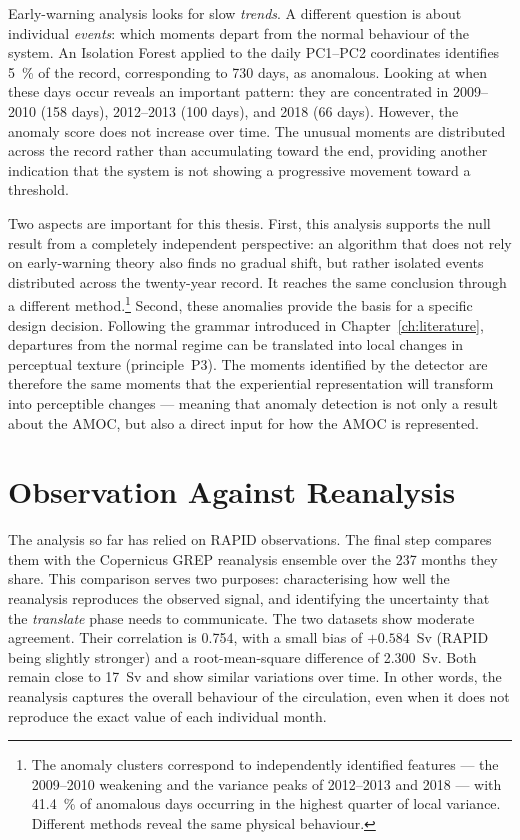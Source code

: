 Early-warning analysis looks for slow \emph{trends}. A different question is about individual \emph{events}: which moments depart from the normal behaviour of the system. An Isolation Forest applied to the daily PC1--PC2 coordinates identifies \SI{5}{\percent} of the record, corresponding to 730 days, as anomalous. Looking at when these days occur reveals an important pattern: they are concentrated in 2009--2010 (158 days), 2012--2013 (100 days), and 2018 (66 days). However, the anomaly score does not increase over time. The unusual moments are distributed across the record rather than accumulating toward the end, providing another indication that the system is not showing a progressive movement toward a threshold.



Two aspects are important for this thesis. First, this analysis supports the null result from a completely independent perspective: an algorithm that does not rely on early-warning theory also finds no gradual shift, but rather isolated events distributed across the twenty-year record. It reaches the same conclusion through a different method.\footnote{The anomaly clusters correspond to independently identified features --- the 2009--2010 weakening and the variance peaks of 2012--2013 and 2018 --- with \SI{41.4}{\percent} of anomalous days occurring in the highest quarter of local variance. Different methods reveal the same physical behaviour.} Second, these anomalies provide the basis for a specific design decision. Following the grammar introduced in Chapter~\ref{ch:literature}, departures from the normal regime can be translated into local changes in perceptual texture (principle~P3). The moments identified by the detector are therefore the same moments that the experiential representation will transform into perceptible changes --- meaning that anomaly detection is not only a result about the AMOC, but also a direct input for how the AMOC is represented.

\section{Observation Against Reanalysis}
\label{sec:detect-copernicus}

The analysis so far has relied on RAPID observations. The final step compares them with the Copernicus GREP reanalysis ensemble over the 237 months they share. This comparison serves two purposes: characterising how well the reanalysis reproduces the observed signal, and identifying the uncertainty that the \emph{translate} phase needs to communicate. The two datasets show moderate agreement. Their correlation is 0.754, with a small bias of $+0.584$~Sv (RAPID being slightly stronger) and a root-mean-square difference of 2.300~Sv. Both remain close to 17~Sv and show similar variations over time. In other words, the reanalysis captures the overall behaviour of the circulation, even when it does not reproduce the exact value of each individual month.

